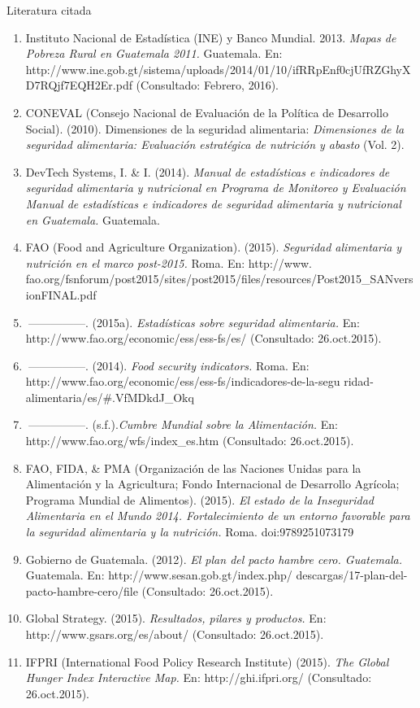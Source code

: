 \newpage
	$\ $\\
 \textcolor{color2}{\Huge Literatura citada}\\
	\normalsize	$\ $\\
	
%
\begin{enumerate}\setlength{\textwidth}{25mm}
	\item {Instituto Nacional de Estadística (INE) y Banco Mundial. 2013. \textit{Mapas de Pobreza Rural en Guatemala 2011.}  Guatemala. En: {http://www.ine.gob.gt/sistema/uploads/2014/01/10/ifRRpEnf0cjUfRZGhyXD7RQjf7EQH2Er.pdf} (Consultado: Febrero, 2016).}
%	
	\item {CONEVAL (Consejo Nacional de Evaluación de la Política de Desarrollo Social). (2010). Dimensiones de la seguridad alimentaria: \textit{Dimensiones de la seguridad alimentaria: Evaluación estratégica de nutrición y abasto} (Vol. 2).}
%	
	\item {DevTech Systems, I. \& I. (2014). \textit{Manual de estadísticas e indicadores de seguridad alimentaria y nutricional en Programa de Monitoreo y Evaluación Manual de estadísticas e indicadores de seguridad alimentaria y nutricional en Guatemala.} Guatemala.}
%
	\item {FAO (Food and Agriculture Organization). (2015). \textit{Seguridad alimentaria y nutrición en el marco post-2015.} Roma. En: http://www.
			fao.org/fsnforum/post2015/sites/post2015/files/resources/Post2015\_SANversionFINAL.pdf}
%
	\item {$\ $---------------. (2015a). \textit{Estadísticas sobre seguridad alimentaria.} En: {http://www.fao.org/economic/ess/ess-fs/es/} (Consultado: 26.oct.2015).}

	\item { $\ $---------------. (2014). \textit{Food security indicators.} Roma. En: http://www.fao.org/economic/ess/ess-fs/indicadores-de-la-segu ridad-alimentaria/es/\#.VfMDkdJ\_Okq}
%
	\item {$\ $---------------. (s.f.).\textit{Cumbre Mundial sobre la Alimentación.} En: {http://www.fao.org/wfs/index\_es.htm} (Consultado: 26.oct.2015).}
%
	\item {FAO, FIDA, \& PMA (Organización de las Naciones Unidas para la Alimentación y la Agricultura; Fondo Internacional de Desarrollo Agrícola; Programa Mundial de Alimentos). (2015). \textit{El estado de la Inseguridad Alimentaria en el Mundo 2014. Fortalecimiento de un entorno favorable para la seguridad alimentaria y la nutrición.} Roma. doi:9789251073179}
%
	\item {Gobierno de Guatemala. (2012). \textit{El plan del pacto hambre cero. Guatemala.} Guatemala. En: http://www.sesan.gob.gt/index.php/ descargas/17-plan-del-pacto-hambre-cero/file (Consultado: 26.oct.2015). }
%
	\item {Global Strategy. (2015). \textit{Resultados, pilares y productos.} En: {http://www.gsars.org/es/about/} (Consultado: 26.oct.2015).}
%
	\item{IFPRI (International Food Policy Research Institute) (2015). \textit{The Global Hunger Index Interactive Map.} En: {http://ghi.ifpri.org/} (Consultado: 26.oct.2015).}
	

\end{enumerate}
